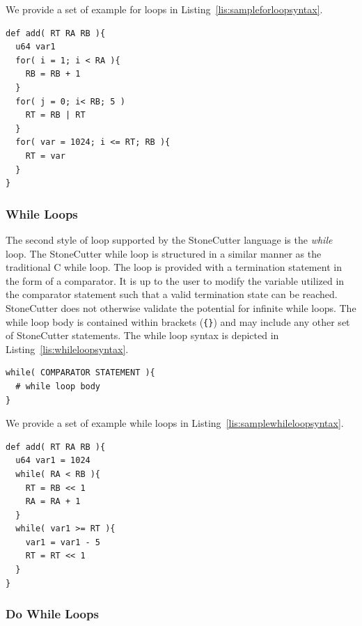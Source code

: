 \documentclass{article}
\begin{document}
We provide a set of example for loops in Listing~\ref{lis:sampleforloopsyntax}.  

\vspace{0.125in}
\begin{lstlisting}[frame=single,style=base,caption={Sample For Loop Syntax},captionpos=b,label={lis:sampleforloopsyntax}]
def add( RT RA RB ){
  u64 var1
  for( i = 1; i < RA ){
    RB = RB + 1
  }
  for( j = 0; i< RB; 5 )
    RT = RB | RT
  }
  for( var = 1024; i <= RT; RB ){
    RT = var
  }
}
\end{lstlisting}

\subsubsection{While Loops}
\label{sec:WhileLoops}

The second style of loop supported by the StoneCutter language is the \textit{while} loop.  The StoneCutter 
while loop is structured in a similar manner as the traditional C while loop.  The loop is provided with a 
termination statement in the form of a comparator.  It is up to the user to modify the variable utilized 
in the comparator statement such that a valid termination state can be reached.  StoneCutter does not otherwise 
validate the potential for infinite while loops.  The while loop body is contained within brackets 
(\texttt{\{\}}) and may include any other set of StoneCutter statements.  The while loop syntax is depicted in 
Listing~\ref{lis:whileloopsyntax}.  

\vspace{0.125in}
\begin{lstlisting}[frame=single,style=base,caption={While Loop Syntax},captionpos=b,label={lis:whileloopsyntax}]
while( COMPARATOR STATEMENT ){
  # while loop body
}
\end{lstlisting}

We provide a set of example while loops in Listing~\ref{lis:samplewhileloopsyntax}.

\vspace{0.125in}
\begin{lstlisting}[frame=single,style=base,caption={Sample While Loop Syntax},captionpos=b,label={lis:samplewhileloopsyntax}]
def add( RT RA RB ){
  u64 var1 = 1024
  while( RA < RB ){
    RT = RB << 1
    RA = RA + 1
  }
  while( var1 >= RT ){
    var1 = var1 - 5
    RT = RT << 1
  }
}
\end{lstlisting}

\clearpage
\subsubsection{Do While Loops}
\label{sec:DoWhileLoops}
\end{document}
